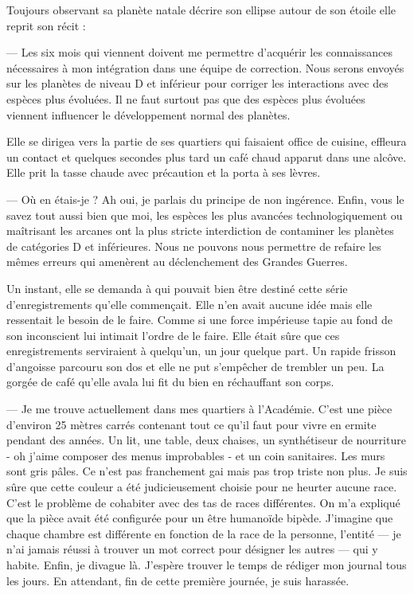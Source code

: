 Toujours observant sa planète natale décrire son ellipse autour de son étoile 
elle reprit son récit :

  — Les six mois qui viennent doivent me permettre d'acquérir les connaissances
nécessaires à mon intégration dans une équipe de correction. Nous serons envoyés
sur les planètes de niveau D et inférieur pour corriger les interactions avec
des espèces plus évoluées. Il ne faut surtout pas que des espèces plus évoluées
viennent influencer le développement normal des planètes.

Elle se dirigea vers la partie de ses quartiers qui faisaient office de cuisine,
effleura un contact et quelques secondes plus tard un café chaud apparut dans
une alcôve. Elle prit la tasse chaude avec précaution et la porta à ses lèvres.

  — Où en étais-je ? Ah oui, je parlais du principe de non ingérence. Enfin,
vous le savez tout aussi bien que moi, les espèces les plus avancées
technologiquement ou maîtrisant les arcanes ont la plus stricte interdiction de
contaminer les planètes de catégories D et inférieures. Nous ne pouvons nous
permettre de refaire les mêmes erreurs qui amenèrent au déclenchement des
Grandes Guerres.

Un instant, elle se demanda à qui pouvait bien être destiné cette série 
d'enregistrements qu'elle commençait. Elle n'en avait aucune idée mais elle
ressentait le besoin de le faire. Comme si une force impérieuse tapie au fond de
son inconscient lui intimait l'ordre de le faire. Elle était sûre que ces
enregistrements serviraient à quelqu'un, un jour quelque part. Un rapide frisson
d'angoisse parcouru son dos et elle ne put s'empêcher de trembler un peu. La
gorgée de café qu'elle avala lui fit du bien en réchauffant son corps.

  — Je me trouve actuellement dans mes quartiers à l'Académie. C'est une pièce
d'environ 25 mètres carrés contenant tout ce qu'il faut pour vivre en ermite
pendant des années. Un lit, une table, deux chaises, un synthétiseur de
nourriture - oh j'aime composer des menus improbables - et un coin sanitaires.
Les murs sont gris pâles. Ce n'est pas franchement gai mais pas trop triste non
plus. Je suis sûre que cette couleur a été judicieusement choisie pour ne
heurter aucune race. C'est le problème de cohabiter avec des tas de races
différentes. On m'a expliqué que la pièce avait été configurée pour un être
humanoïde bipède. J'imagine que chaque chambre est différente en fonction de la
race de la personne, l'entité — je n'ai jamais réussi à trouver un mot correct
pour désigner les autres — qui y habite. Enfin, je divague là. J'espère trouver
le temps de rédiger mon journal tous les jours. En attendant, fin de cette
première journée, je suis harassée.

